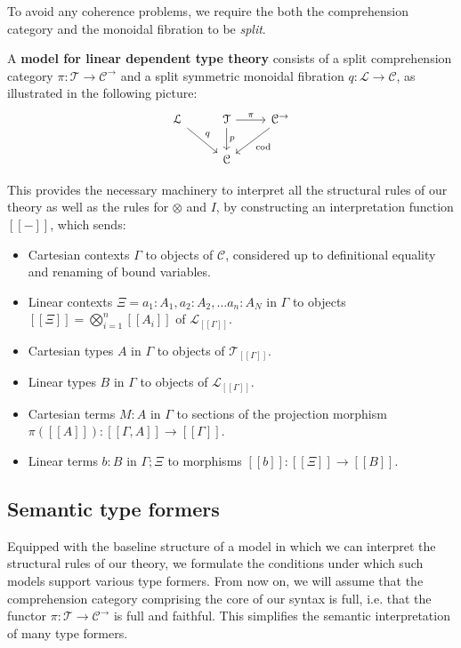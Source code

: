 \documentclass[a4paper,english]{lipics-v2018}
\begin{document}
To avoid any coherence problems, we require the both the comprehension category and the monoidal fibration to be \textit{split}.
\begin{definition}
A \textbf{model for linear dependent type theory} consists of a split comprehension category $\pi : \mathcal{T} \to \mathcal{C}^\to$ and a split symmetric monoidal fibration $q : \mathcal{L} \to \mathcal{C}$, as illustrated in the following picture:
\[
\begin{tikzcd}
\mathcal{L} \ar[rd, "q"] & \mathcal{T} \ar[d, "p"] \ar[r, "\pi"] & \mathcal{C^\rightarrow} \ar[ld, "\text{cod}"]\\
& \mathcal{C}
\end{tikzcd}
\]
\end{definition}

This provides the necessary machinery to interpret all the structural rules of our theory as well as the rules for $\otimes$ and $I$, by constructing an interpretation function $[[-]]$, which sends:
  \begin{itemize}
  \item Cartesian contexts $\Gamma$ to objects of $\mathcal{C}$, considered up to definitional equality and renaming of bound variables.
  \item Linear contexts $\Xi = a_1 : A_1, a_2 : A_2, \dots a_n : A_N$ in $\Gamma$ to objects $[[\Xi]] = \bigotimes^n_{i = 1}[[A_i]]$ of $\mathcal{L}_{[[\Gamma]]}$.
  \item Cartesian types $A$ in $\Gamma$ to objects of $\mathcal{T}_{[[\Gamma]]}$.
  \item Linear types $B$ in $\Gamma$ to objects of $\mathcal{L}_{[[\Gamma]]}$.
  \item Cartesian terms $M : A$ in $\Gamma$ to sections of the projection morphism $\pi([[A]]) : [[\Gamma,A]] \to [[\Gamma]]$.
  \item Linear terms $b : B$ in $\Gamma; \Xi$ to morphisms $[[b]] : [[\Xi]] \to [[B]]$.
  \end{itemize}
\subsection{Semantic type formers}\label{semtypform}
Equipped with the baseline structure of a model in which we can interpret the structural rules of our theory, we formulate the conditions under which such models support various type formers.
From now on, we will assume that the comprehension category comprising the core of our syntax is full, i.e. that the functor $\pi : \mathcal{T} \to \mathcal{C}^{\to}$ is full and faithful. This simplifies the semantic interpretation of many type formers.
\end{document}
